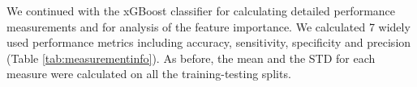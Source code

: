 \documentclass{bmcart}
\begin{document}





We continued with the xGBoost classifier for calculating detailed performance measurements and for analysis of the feature importance. We calculated 7 widely used performance metrics including accuracy, sensitivity, specificity and precision (Table \ref{tab:measurementinfo}). As before, the mean and the STD for each measure were calculated on all the training-testing splits.
\end{document}
